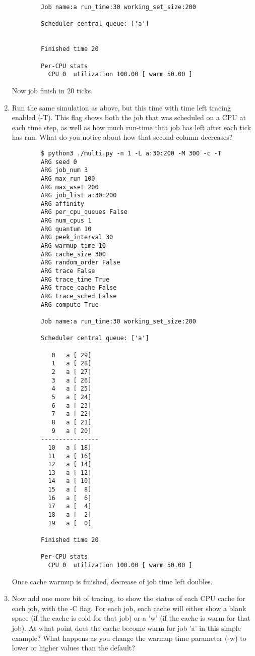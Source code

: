 \documentclass{article}
\begin{document}
\begin{enumerate}[label=\textbf{\arabic*}), start=1]
{\begin{verbatim}
        Job name:a run_time:30 working_set_size:200
        
        Scheduler central queue: ['a']
        
        
        Finished time 20
        
        Per-CPU stats
          CPU 0  utilization 100.00 [ warm 50.00 ]
    \end{verbatim}
    }
    Now job finish in 20 ticks.
\newpage
    \item Run the same simulation as above, but this time with time
    left tracing enabled (-T). This flag shows both the job that was
    scheduled on a CPU at each time step, as well as how much run-time
    that job has left after each tick has run. What do you notice
    about how that second column decreases?
    {\scriptsize
    \begin{verbatim}
        $ python3 ./multi.py -n 1 -L a:30:200 -M 300 -c -T
        ARG seed 0
        ARG job_num 3
        ARG max_run 100
        ARG max_wset 200
        ARG job_list a:30:200
        ARG affinity 
        ARG per_cpu_queues False
        ARG num_cpus 1
        ARG quantum 10
        ARG peek_interval 30
        ARG warmup_time 10
        ARG cache_size 300
        ARG random_order False
        ARG trace False
        ARG trace_time True
        ARG trace_cache False
        ARG trace_sched False
        ARG compute True
        
        Job name:a run_time:30 working_set_size:200
        
        Scheduler central queue: ['a']
        
           0   a [ 29]      
           1   a [ 28]      
           2   a [ 27]      
           3   a [ 26]      
           4   a [ 25]      
           5   a [ 24]      
           6   a [ 23]      
           7   a [ 22]      
           8   a [ 21]      
           9   a [ 20]      
        ----------------
          10   a [ 18]      
          11   a [ 16]      
          12   a [ 14]      
          13   a [ 12]      
          14   a [ 10]      
          15   a [  8]      
          16   a [  6]      
          17   a [  4]      
          18   a [  2]      
          19   a [  0]      
        
        Finished time 20
        
        Per-CPU stats
          CPU 0  utilization 100.00 [ warm 50.00 ]
    \end{verbatim}
    }
    Once cache warmup is finished, decrease of job time left doubles.
\newpage
    \item Now add one more bit of tracing, to show the status
    of each CPU cache for each job, with the -C flag. For each
    job, each cache will either show a blank space (if the cache
    is cold for that job) or a 'w' (if the cache is warm for that
    job). At what point does the cache become warm for job 'a' in
    this simple example? What happens as you change the warmup time
    parameter (-w) to lower or higher values than the default?


\end{enumerate}
\end{document}
